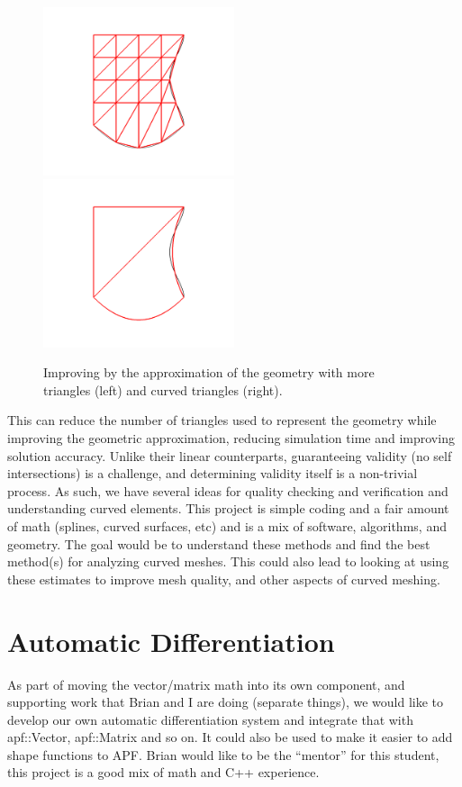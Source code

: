 \documentclass[12pt]{article}
\begin{document}
\begin{figure}
\includegraphics[width=0.5\textwidth]{images/uniform2.png}
\includegraphics[width=0.5\textwidth]{images/curved3.png}
\label{fig:endcurv}
\caption{Improving by the approximation of the geometry with more triangles (left) and curved triangles (right).}
\end{figure}
This can reduce the number of triangles used to represent the geometry while improving the geometric approximation, reducing simulation time and improving solution accuracy. Unlike their linear counterparts, guaranteeing validity (no self intersections) is a challenge, and determining validity itself is a non-trivial process. As such, we have several ideas for quality checking and verification and understanding curved elements. This project is simple coding and a fair amount of math (splines, curved surfaces, etc) and is a mix of software, algorithms, and geometry. The goal would be to understand these methods and find the best method(s) for analyzing curved meshes. This could also lead to looking at using these estimates to improve mesh quality, and other aspects of curved meshing.
\section{Automatic Differentiation} 
As part of moving the vector/matrix math into its own component, and supporting
work that Brian and I are doing (separate things), we would like to develop our
own automatic differentiation system and integrate that with apf::Vector,
apf::Matrix and so on. It could also be used to make it easier to add shape
functions to APF. Brian would like to be the “mentor” for this student, this
project is a good mix of math and C++ experience.
\end{document}
